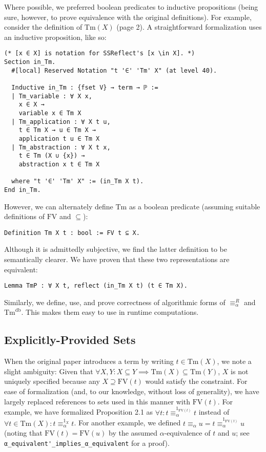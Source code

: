 \documentclass{article}
\begin{document}
Where possible, we preferred boolean predicates to inductive propositions (being sure, however, to
prove equivalence with the original definitions). For example, consider the definition of
$\textrm{Tm}(X)$ (page 2). A straightforward formalization uses an inductive proposition, like so:

\begin{verbatim}
(* [x ∈ X] is notation for SSReflect's [x \in X]. *)
Section in_Tm.
  #[local] Reserved Notation "t '∈' 'Tm' X" (at level 40).

  Inductive in_Tm : {fset V} → term → ℙ :=
  | Tm_variable : ∀ X x,
    x ∈ X →
    variable x ∈ Tm X
  | Tm_application : ∀ X t u,
    t ∈ Tm X → u ∈ Tm X →
    application t u ∈ Tm X
  | Tm_abstraction : ∀ X t x,
    t ∈ Tm (X ∪ {x}) →
    abstraction x t ∈ Tm X

  where "t '∈' 'Tm' X" := (in_Tm X t).
End in_Tm.
\end{verbatim}

However, we can alternately define $\textrm{Tm}$ as a boolean predicate (assuming suitable
definitions of $\textrm{FV}$ and $\subseteq$):

\begin{verbatim}
Definition Tm X t : bool := FV t ⊆ X.
\end{verbatim}

Although it is admittedly subjective, we find the latter definition to be semantically clearer. We
have proven that these two representations are equivalent:

\begin{verbatim}
Lemma TmP : ∀ X t, reflect (in_Tm X t) (t ∈ Tm X).
\end{verbatim}

Similarly, we define, use, and prove correctness of algorithmic forms of $\equiv_\alpha^R$ and
$\textrm{Tm}^{\textrm{db}}$. This makes them easy to use in runtime computations.

\subsection{Explicitly-Provided Sets}

When the original paper introduces a term by writing $t \in \textrm{Tm}(X)$, we note a slight
ambiguity: Given that $\forall X, Y : X \subseteq Y \implies \textrm{Tm}(X) \subseteq
\textrm{Tm}(Y)$, $X$ is not uniquely specified because any $X \supseteq \textrm{FV}(t)$ would
satisfy the constraint. For ease of formalization (and, to our knowledge, without loss of
generality), we have largely replaced references to sets used in this manner with $\textrm{FV}(t)$.
For example, we have formalized Proposition 2.1 as $\forall t : t \equiv_\alpha^{1_{\textrm{FV}(t)}}
t$ instead of $\forall t \in \textrm{Tm}(X) : t \equiv_\alpha^{1_X} t$. For another example, we
defined $t \equiv_\alpha u = t \equiv_\alpha^{1_{\textrm{FV}(t)}} u$ (noting that $\textrm{FV}(t) =
\textrm{FV}(u)$ by the assumed $\alpha$-equivalence of $t$ and $u$; see
\verb|α_equivalent'_implies_α_equivalent| for a proof).
\end{document}
